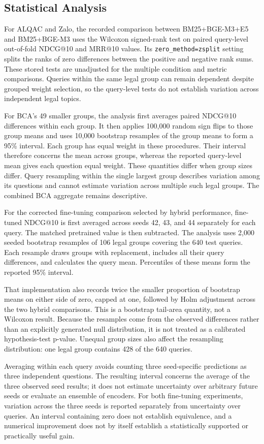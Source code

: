 \subsection{Statistical Analysis}

For ALQAC and Zalo, the recorded comparison between BM25+BGE-M3+E5 and BM25+BGE-M3 uses the Wilcoxon signed-rank test on paired query-level out-of-fold NDCG@10 and MRR@10 values. Its \texttt{zero\_method=zsplit} setting splits the ranks of zero differences between the positive and negative rank sums. These stored tests are unadjusted for the multiple condition and metric comparisons. Queries within the same legal group can remain dependent despite grouped weight selection, so the query-level tests do not establish variation across independent legal topics.

For BCA's 49 smaller groups, the analysis first averages paired NDCG@10 differences within each group. It then applies 100,000 random sign flips to those group means and uses 10,000 bootstrap resamples of the group means to form a 95\% interval. Each group has equal weight in these procedures. Their interval therefore concerns the mean across groups, whereas the reported query-level mean gives each question equal weight. These quantities differ when group sizes differ. Query resampling within the single largest group describes variation among its questions and cannot estimate variation across multiple such legal groups. The combined BCA aggregate remains descriptive.

For the corrected fine-tuning comparison selected by hybrid performance, fine-tuned NDCG@10 is first averaged across seeds 42, 43, and 44 separately for each query. The matched pretrained value is then subtracted. The analysis uses 2,000 seeded bootstrap resamples of 106 legal groups covering the 640 test queries. Each resample draws groups with replacement, includes all their query differences, and calculates the query mean. Percentiles of these means form the reported 95\% interval.

That implementation also records twice the smaller proportion of bootstrap means on either side of zero, capped at one, followed by Holm adjustment across the two hybrid comparisons. This is a bootstrap tail-area quantity, not a Wilcoxon result. Because the resamples come from the observed differences rather than an explicitly generated null distribution, it is not treated as a calibrated hypothesis-test p-value. Unequal group sizes also affect the resampling distribution: one legal group contains 428 of the 640 queries.

Averaging within each query avoids counting three seed-specific predictions as three independent questions. The resulting interval concerns the average of the three observed seed results; it does not estimate uncertainty over arbitrary future seeds or evaluate an ensemble of encoders. For both fine-tuning experiments, variation across the three seeds is reported separately from uncertainty over queries. An interval containing zero does not establish equivalence, and a numerical improvement does not by itself establish a statistically supported or practically useful gain.

